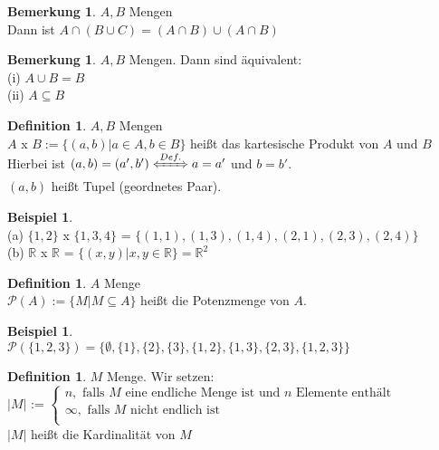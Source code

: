 \documentclass[10pt,a4paper,numbers=endperiod]{scrartcl}
\theoremstyle{definition}
\newtheorem{defi}[satz]{Definition}
\newtheorem{bem}[satz]{Bemerkung}
\newtheorem{bsp}[satz]{Beispiel}
\begin{document}
\begin{bem}
	$A, B$ Mengen \\
	Dann ist $A \cap (B \cup C) = (A \cap B) \cup (A \cap B)$
\end{bem}

\begin{bem}
	$A, B$ Mengen. Dann sind äquivalent:\\ 
	(i) $A \cup B = B$ \\
	(ii) $A \subseteq B$\\
\end{bem}

\begin{defi}
	$A, B$ Mengen\\
	$A$ x $B := \{(a,b)| a \in A, b \in B\}$ heißt das kartesische Produkt von $A$ und $B$\\
	Hierbei ist $(a,b)=(a',b') \xLeftrightarrow{Def.} a= a'$ und $b=b'$.\\
	$(a,b)$ heißt Tupel (geordnetes Paar). 
\end{defi}

\begin{bsp}
	$ $ \\
	(a) $\{1,2\}$ x $\{1,3,4\}$ = $\{(1,1), (1,3),(1,4),(2,1),(2,3),(2,4)\}$\\
	(b) $\mathbb{R}$ x $\mathbb{R}$ = $\{(x,y)|x,y \in \mathbb{R}\} = \mathbb{R}^{2}$
\end{bsp}

\begin{defi}
	$A$ Menge \\
	$\mathcal{P}(A) := \{ M|M \subseteq A \}$ heißt die Potenzmenge von $A$.
\end{defi}

\begin{bsp}
	$ $ \\
	$\mathcal{P}(\{1,2,3\}) = \{\emptyset, \{1\}, \{2\}, \{3\}, \{1,2\}, \{1,3\}, \{2,3\}, \{1,2,3\}\}$
\end{bsp}

\begin{defi}
	$M$ Menge. Wir setzen:\\
	$|M|$ := $\begin{cases} n, \text{ falls } M \text{ eine endliche Menge ist und } n \text{ Elemente enthält}\\
		\infty, \text{ falls } M \text{ nicht endlich ist}\\
	\end{cases}$\\
	$|M|$ heißt die Kardinalität von $M$
\end{defi}
\end{document}
